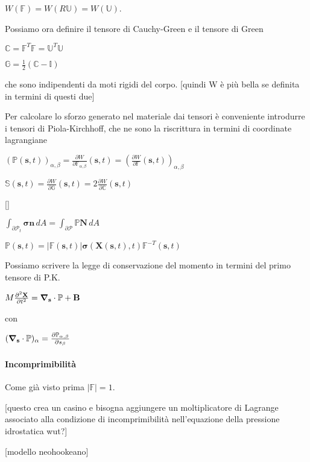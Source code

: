 $W(\mathbb{F}) = W(R\mathbb{U}) = W(\mathbb{U})$.

Possiamo ora definire il tensore di Cauchy-Green e il tensore di Green

$\mathbb{C} = \mathbb{F}^T\mathbb{F} = \mathbb{U}^T\mathbb{U}$

$\mathbb{G} = \frac{1}{2}(\mathbb{C}-\mathbb{I})$

che sono indipendenti da moti rigidi del corpo. [quindi W è più bella se definita in termini di questi due]

Per calcolare lo sforzo generato nel materiale dai tensori è conveniente introdurre i tensori di Piola-Kirchhoff, che ne sono la riscrittura in termini di coordinate lagrangiane

$(\mathbb{P}(\mathbf{s},t))_{\alpha,\beta} = \frac{\partial W}{\partial \mathbb{F}_{\alpha,\beta}} (\mathbf{s},t) =( \frac{\partial W}{\partial \mathbb{F}} (\mathbf{s},t))_{\alpha,\beta}$

$\mathbb{S}(\mathbf{s},t)=\frac{\partial W}{\partial\mathbb{G}}(\mathbf{s},t)=2\frac{\partial W}{\partial\mathbb{C}}(\mathbf{s},t)$

[]

$\int_{\partial\mathcal{P}_t} \mathbf{\sigma}\mathbf{n} \, dA = \int_{\partial\mathcal{P}} \mathbb{P}\mathbf{N} \, dA$

$\mathbb{P}(\mathbf{s},t) = \vert \mathbb{F}(\mathbf{s},t) \vert \mathbf{\sigma}(\mathbf{X}(\mathbf{s},t),t) \mathbb{F}^{-T}(\mathbf{s},t)$


Possiamo scrivere la legge di conservazione del momento in termini del primo tensore di P.K.

$M\frac{\partial^2\mathbf{X}}{\partial t^2} = \boldsymbol{\nabla}_\mathbf{s} \cdot \mathbb{P} + \mathbf{B}$

con 

$(\boldsymbol{\nabla}_\mathbf{s} \cdot \mathbb{P} )_{\alpha} = \frac{\partial\mathbb{P}_{\alpha,\beta}}{\partial s_\beta}$

\paragraph{Incomprimibilità}

Come già visto prima $\vert \mathbb{F} \vert = 1$.

[questo crea un casino e bisogna aggiungere un moltiplicatore di Lagrange associato alla condizione di incomprimibilità nell'equazione della pressione idrostatica wut?]

[modello neohookeano]

